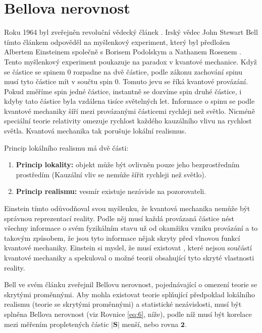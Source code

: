\section{Bellova nerovnost}

Roku 1964 byl zveřejněn revoluční vědecký článek \parencite{bellineq}. Irský vědec John Stewart Bell tímto článkem odpověděl na myšlenkový experiment, který byl předložen Albertem Einsteinem společně s Borisem Podolskym a Nathanem Rosenem \parencite*{eprpar}. Tento myšlenkový experiment poukazuje na paradox v kvantové mechanice. Když se částice se spinem 0 rozpadne na dvě částice, podle zákonu zachování spinu musí tyto částice mít v součtu spin 0. Tomuto jevu se říká kvantové provázání. Pokud změříme spin jedné částice, instantně se dozvíme spin druhé částice, i kdyby tato částice byla vzdálena tisíce světelných let. Informace o spinu se podle kvantové mechaniky šíří mezi provázanými částicemi rychleji než světlo. Nicméně speciální teorie relativity omezuje rychlost každého kauzálního vlivu na rychlost světla. Kvantová mechanika tak porušuje lokální realismus.

Princip lokálního realismu má dvě části:
    \begin{enumerate}
        \item \textbf{Princip lokality:} objekt může být ovlivněn pouze jeho bezprostředním prostředím (Kauzální vliv se nemůže šířit rychleji než světlo). \parencite{lokalita}
        \item \textbf{Princip realismu:} vesmír existuje nezávisle na pozorovateli. \parencite{realismus}
    \end{enumerate}
    
Einstein tímto odůvodňoval svou myšlenku, že kvantová mechanika nemůže být správnou reprezentací reality. Podle něj musí každá provázaná částice nést všechny informace o svém fyzikálním stavu už od okamžiku vzniku provázání a to takovým způsobem, že jsou tyto informace nějak skryty před vlnovou funkcí kvantové mechaniky. Einstein si myslel, že musí existovat , které nejsou součástí kvantové mechaniky a spekuloval o možné teorii obsahující tyto skryté vlastnosti reality.

Bell ve svém článku \parencite*{bellineq} zveřejnil Bellovu nerovnost, pojednávající o omezení teorie se skrytými proměnnými. Aby mohla existovat teorie splňující předpoklad lokálního realismu (teorie se skrytými proměnnými) a statistické nezávislosti, musí být splněna Bellova nerovnost (viz Rovnice \ref{eq:6}, níže), podle níž musí být korelace mezi měřením propletených částic $\bm{|S|}$ menší, nebo rovna $\bm{2}$.

